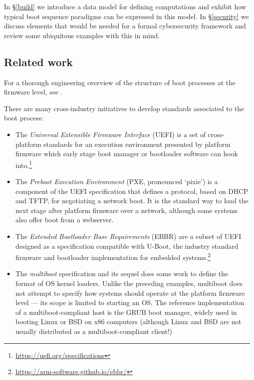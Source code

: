 In \S\ref{build} we introduce a data model for defining computations and exhibit how typical boot sequence paradigms can be expressed in this model.
%
In \S\ref{security} we discuss elements that would be needed for a formal cybersecurity framework and review some ubiquitous examples with this in mind.


\subsection{Related work}\label{related-work}

For a thorough engineering overview of the structure of boot processes at the firmware level, see \cite{yao2020building}.

There are many cross-industry initiatives to develop standards associated to the boot process:
\begin{itemize}
  \item
   The \emph{Universal Extensible Firmware Interface} (UEFI) is a set of cross-platform standards for an execution environment presented by platform firmware which early stage boot manager or bootloader software can hook into.\footnote{\url{https://uefi.org/specifications}}

  \item
    The \emph{Preboot Execution Environment} (PXE, pronounced `pixie') is a component of the UEFI specification that defines a protocol, based on DHCP and TFTP, for negotiating a network boot.
    It is the standard way to load the next stage after platform firmware over a network, although some systems also offer boot from a webserver.

  \item
    The \emph{Extended Bootloader Base Requirements} (EBBR) are a subset of UEFI designed as a specification compatible with U-Boot, the industry standard firmware and bootloader implementation for embedded systems.\footnote{\url{https://arm-software.github.io/ebbr/}}

  \item
    The \emph{multiboot} specification and its sequel does some work to define the format of OS kernel loaders. 
    Unlike the preceding examples, multiboot does not attempt to specify how systems should operate at the platform firmware level --- its scope is limited to starting an OS.
    The reference implementation of a multiboot-compliant host is the GRUB boot manager, widely used in booting Linux or BSD on x86 computers (although Linux and BSD are not usually distributed as a multiboot-compliant client!)


\end{itemize}
